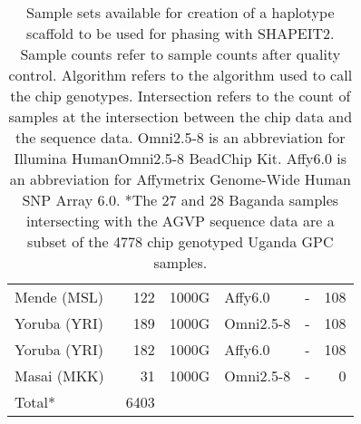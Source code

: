 \begin{table}[htp]
\begin{tabular}{lrlllr}
Mende (MSL) & 122 & 1000G & Affy6.0 & - & 108 \\

Yoruba (YRI) & 189 & 1000G & Omni2.5-8 & - & 108 \\
Yoruba (YRI) & 182 & 1000G & Affy6.0 & - & 108 \\

Masai (MKK) & 31 & 1000G & Omni2.5-8 & - & 0 \\
\hline
Total* & ~6403 & & & & 
\end{tabular}
\caption{Sample sets available for creation of a haplotype scaffold to be used for phasing with SHAPEIT2. Sample counts refer to sample counts after quality control. Algorithm refers to the algorithm used to call the chip genotypes. Intersection refers to the count of samples at the intersection between the chip data and the sequence data. Omni2.5-8 is an abbreviation for Illumina HumanOmni2.5-8 BeadChip Kit. Affy6.0 is an abbreviation for Affymetrix Genome-Wide Human SNP Array 6.0. *The 27 and 28 Baganda samples intersecting with the AGVP sequence data are a subset of the 4778 chip genotyped Uganda GPC samples.}
\label{tab:samples_chip}
\end{table}